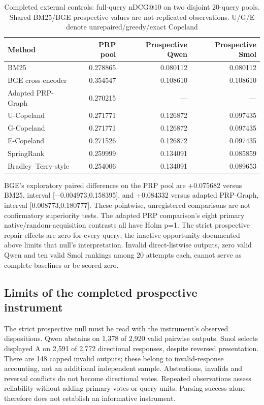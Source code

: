 \documentclass[pdflatex,iicol,sn-basic,Numbered]{sn-jnl}
\begin{document}
\begin{table}[t]
\caption{Completed external controls: full-query nDCG@10 on two disjoint 20-query pools. Shared BM25/BGE prospective values are not replicated observations. U/G/E denote unrepaired/greedy/exact Copeland}
\label{tab:baselines}\papertable
\begin{tabularx}{\linewidth}{@{}Yrrr@{}}\toprule
Method & PRP pool & Prospective Qwen & Prospective Smol\\\midrule
BM25&0.278865&0.080112&0.080112\\
BGE cross-encoder&0.354547&0.108610&0.108610\\
Adapted PRP-Graph&0.270215&---&---\\
U-Copeland&0.271771&0.126872&0.097435\\
G-Copeland&0.271771&0.126872&0.097435\\
E-Copeland&0.271526&0.126872&0.097435\\
SpringRank&0.259999&0.134091&0.085859\\
Bradley--Terry-style&0.254006&0.134091&0.089653\\\bottomrule
\end{tabularx}
\end{table}

BGE's exploratory paired differences on the PRP pool are +0.075682 versus BM25, interval [−0.004973,0.158395], and +0.084332 versus adapted PRP-Graph, interval [0.008773,0.180777]. These pointwise, unregistered comparisons are not confirmatory superiority tests. The adapted PRP comparison's eight primary native/random-acquisition contrasts all have Holm p=1. The strict prospective repair effects are zero for every query; the inactive opportunity documented above limits that null's interpretation. Invalid direct-listwise outputs, zero valid Qwen and ten valid Smol rankings among 20 attempts each, cannot serve as complete baselines or be scored zero.

\subsection{Limits of the completed prospective instrument}
The strict prospective null must be read with the instrument's observed dispositions. Qwen abstains on 1,378 of 2,920 valid pairwise outputs. Smol selects displayed A on 2,591 of 2,772 directional responses, despite reversed presentation. There are 148 capped invalid outputs; these belong to invalid-response accounting, not an additional independent sample. Abstentions, invalids and reversal conflicts do not become directional votes. Repeated observations assess reliability without adding primary votes or query units. Parsing success alone therefore does not establish an informative instrument.
\end{document}
